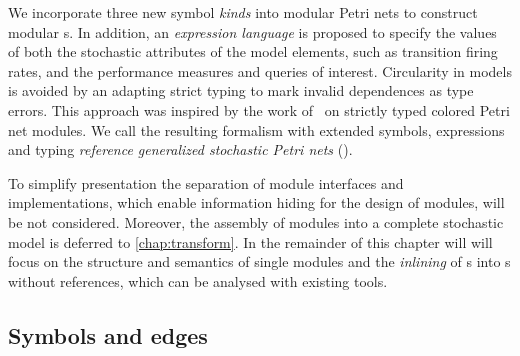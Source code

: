 We incorporate three new symbol \emph{kinds} into modular Petri nets to construct modular s. In addition, an \emph{expression language} is proposed to specify the values of both the stochastic attributes of the model elements, such as transition firing rates, and the performance measures and queries of interest. Circularity in models is avoided by an adapting strict typing to mark invalid dependences as type errors. This approach was inspired by the work of~\citet{Kindler07modular} on strictly typed colored Petri net modules. We call the resulting formalism with extended symbols, expressions and typing \emph{reference generalized stochastic Petri nets} ().

To simplify presentation the separation of module interfaces and implementations, which enable information hiding for the design of modules, will be not considered. Moreover, the assembly of modules into a complete stochastic model is deferred to \cref{chap:transform}. In the remainder of this chapter will will focus on the structure and semantics of single  modules and the \emph{inlining} of s into s without references, which can be analysed with existing tools. 

\subsection{Symbols and edges}

